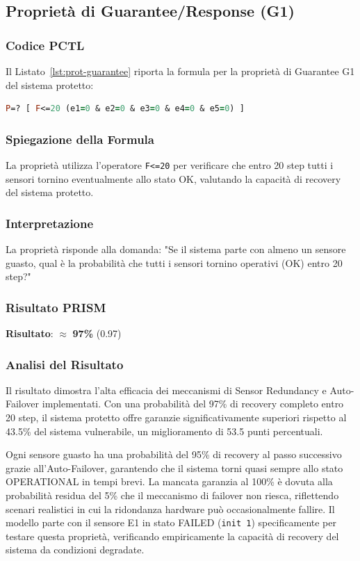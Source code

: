 \subsection{Proprietà di Guarantee/Response (G1)}

\subsubsection{Codice PCTL}
Il Listato~\ref{lst:prot-guarantee} riporta la formula per la proprietà di Guarantee G1 del sistema protetto:
\begin{lstlisting}[style=mystyle, language=Prolog, caption={Proprietà Guarantee G1 (protetto)}, label=lst:prot-guarantee]
P=? [ F<=20 (e1=0 & e2=0 & e3=0 & e4=0 & e5=0) ]
\end{lstlisting}

\subsubsection{Spiegazione della Formula}
La proprietà utilizza l'operatore \texttt{F<=20} per verificare che entro 20 step tutti i sensori tornino eventualmente allo stato OK, valutando la capacità di recovery del sistema protetto.

\subsubsection{Interpretazione}
La proprietà risponde alla domanda: "Se il sistema parte con almeno un sensore guasto, qual è la probabilità che tutti i sensori tornino operativi (OK) entro 20 step?"

\subsubsection{Risultato PRISM}
\textbf{Risultato}: $\approx$ \textbf{97\%} (0.97)

\subsubsection{Analisi del Risultato}
Il risultato dimostra l'alta efficacia dei meccanismi di Sensor Redundancy e Auto-Failover implementati. Con una probabilità del 97\% di recovery completo entro 20 step, il sistema protetto offre garanzie significativamente superiori rispetto al 43.5\% del sistema vulnerabile, un miglioramento di 53.5 punti percentuali.

Ogni sensore guasto ha una probabilità del 95\% di recovery al passo successivo grazie all'Auto-Failover, garantendo che il sistema torni quasi sempre allo stato OPERATIONAL in tempi brevi. La mancata garanzia al 100\% è dovuta alla probabilità residua del 5\% che il meccanismo di failover non riesca, riflettendo scenari realistici in cui la ridondanza hardware può occasionalmente fallire. Il modello parte con il sensore E1 in stato FAILED (\texttt{init 1}) specificamente per testare questa proprietà, verificando empiricamente la capacità di recovery del sistema da condizioni degradate.

